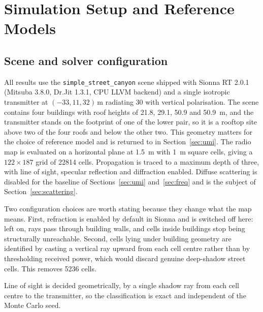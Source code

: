 \documentclass[conference]{IEEEtran}
\begin{document}
\section{Simulation Setup and Reference Models}
\label{sec:setup}

\subsection{Scene and solver configuration}

All results use the \texttt{simple\_\hspace{0pt}street\_\hspace{0pt}canyon} scene shipped with Sionna
RT 2.0.1 (Mitsuba 3.8.0, Dr.Jit 1.3.1, CPU LLVM backend) and a single
isotropic transmitter at $(-33, 11, 32)$\,m radiating
\SI{30}{\dBm} with vertical polarisation. The scene contains four buildings
with roof heights of \SI{21.8}{}, \SI{29.1}{}, \SI{50.9}{} and
\SI{50.9}{\metre}, and the transmitter stands on the footprint of one of the
lower pair, so it is a rooftop site above two of the four roofs and below the
other two. This geometry matters for the choice of reference model and is
returned to in Section~\ref{sec:umi}. The radio map is evaluated on a
horizontal plane at \SI{1.5}{\metre} with \SI{1}{\metre} square cells, giving a
$122 \times 187$ grid of \num{22814} cells. Propagation is traced to a maximum
depth of three, with line of sight, specular reflection and diffraction
enabled. Diffuse scattering is disabled for the baseline of
Sections~\ref{sec:umi} and~\ref{sec:freq} and is the subject of
Section~\ref{sec:scattering}.

Two configuration choices are worth stating because they change what the map
means. First, refraction is enabled by default in Sionna and is switched off
here: left on, rays pass through building walls, and cells inside buildings
stop being structurally unreachable. Second, cells lying under building
geometry are identified by casting a vertical ray upward from each cell centre
rather than by thresholding received power, which would discard genuine
deep-shadow street cells. This removes \num{5236} cells.

Line of sight is decided geometrically, by a single shadow ray from each cell
centre to the transmitter, so the classification is exact and independent of
the Monte Carlo seed.
\end{document}
